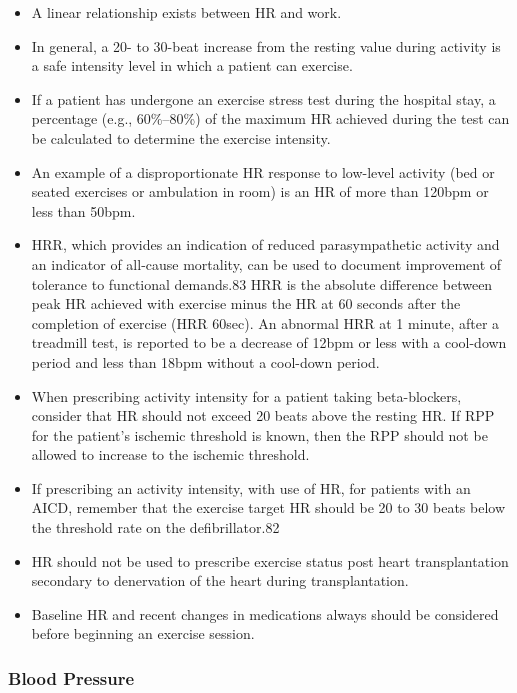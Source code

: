 \begin{itemize}
\item A linear relationship exists between HR and work.
\item In general, a 20- to 30-beat increase from the resting value during activity is a safe intensity level in which a patient can exercise.
\item If a patient has undergone an exercise stress test during the hospital stay, a percentage (e.g., 60\%–80\%) of the maximum HR achieved during the test can be calculated to determine the exercise intensity.
\item An example of a disproportionate HR response to low-level activity (bed or seated exercises or ambulation in room) is an HR of more than 120bpm or less than 50bpm.
\item HRR, which provides an indication of reduced parasympathetic activity and an indicator of all-cause mortality, can be used to document improvement of tolerance to functional demands.83 HRR is the absolute difference between peak HR achieved with exercise minus the HR at 60 seconds after the completion of exercise (HRR 60sec).  An abnormal HRR at 1 minute, after a treadmill test, is reported to be a decrease of 12bpm or less with a cool-down period and less than 18bpm without a cool-down period.
\item When prescribing activity intensity for a patient taking beta-blockers, consider that HR should not exceed 20 beats above the resting HR. If RPP for the patient's ischemic threshold is known, then the RPP should not be allowed to increase to the ischemic threshold.
\item If prescribing an activity intensity, with use of HR, for patients with an AICD, remember that the exercise target HR should be 20 to 30 beats below the threshold rate on the defibrillator.82
\item HR should not be used to prescribe exercise status post heart transplantation secondary to denervation of the heart during transplantation.
\item Baseline HR and recent changes in medications always should be considered before beginning an exercise session.
\end{itemize}

\subsubsection{Blood Pressure}


